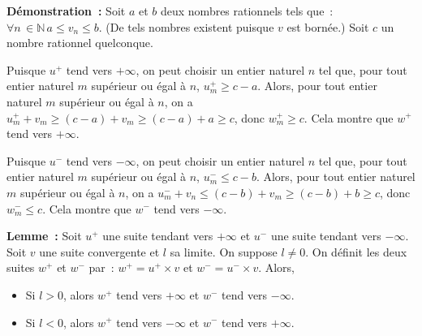 \medskip

\noindent\textbf{Démonstration :} 
    Soit $a$ et $b$ deux nombres rationnels tels que : $\forall n \, \in \mathbb{N} \, a \leq v_n \leq b$. 
    (De tels nombres existent puisque $v$ est bornée.)
    Soit $c$ un nombre rationnel quelconque.

    Puisque $u^+$ tend vers $+\infty$, on peut choisir un entier naturel $n$ tel que, pour tout entier naturel $m$ supérieur ou égal à $n$, $u^+_m \geq c - a$.
    Alors, pour tout entier naturel $m$ supérieur ou égal à $n$, on a $u^+_m + v_m \geq (c - a) + v_m \geq (c - a) + a \geq c$, donc $w^+_m \geq c$.
    Cela montre que $w^+$ tend vers $+\infty$.
    
    Puisque $u^-$ tend vers $-\infty$, on peut choisir un entier naturel $n$ tel que, pour tout entier naturel $m$ supérieur ou égal à $n$, $u^-_m \leq c - b$.
    Alors, pour tout entier naturel $m$ supérieur ou égal à $n$, on a $u^-_m + v_n \leq (c - b) + v_m \geq (c - b) + b \geq c$, donc $w^-_m \leq c$.
    Cela montre que $w^-$ tend vers $-\infty$.

    \done

\medskip

\noindent\textbf{Lemme :} Soit $u^+$ une suite tendant vers $+\infty$ et $u^-$ une suite tendant vers $-\infty$.
    Soit $v$ une suite convergente et $l$ sa limite.
    On suppose $l \neq 0$.
    On définit les deux suites $w^+$ et $w^-$ par : $w^+ = u^+ \times v$ et $w^- = u^- \times v$.
    Alors, 
    \begin{itemize}[nosep]
        \item Si $l > 0$, alors $w^+$ tend vers $+\infty$ et $w^-$ tend vers $-\infty$.
        \item Si $l < 0$, alors $w^+$ tend vers $-\infty$ et $w^-$ tend vers $+\infty$.
    \end{itemize}

\medskip

